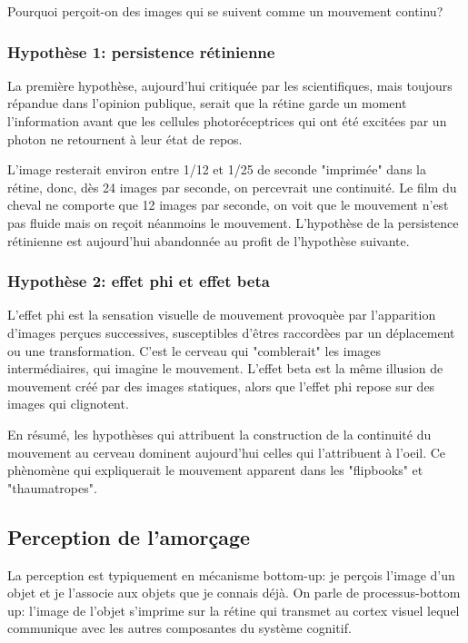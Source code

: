Pourquoi per\c{c}oit-on des images qui se suivent comme un mouvement continu?

\subsubsection{Hypoth\`ese 1: persistence r\'etinienne}

La premi\`ere hypoth\`ese, aujourd'hui critiqu\'ee par les scientifiques, mais toujours r\'epandue dans l'opinion publique, serait que la r\'etine garde un moment l'information avant que les cellules photor\'eceptrices qui ont \'et\'e excit\'ees par un photon ne retournent \`a leur \'etat de repos.

L'image resterait environ entre 1/12 et 1/25 de seconde "imprim\'ee" dans la r\'etine, donc, d\`es 24 images par seconde, on percevrait une continuit\'e. Le film du cheval ne comporte que 12 images par seconde, on voit que le mouvement n'est pas fluide mais on re\c{c}oit n\'eanmoins le mouvement. L'hypoth\`ese de la persistence r\'etinienne est aujourd'hui abandonn\'ee au profit de l'hypoth\`ese suivante.

\subsubsection{Hypoth\`ese 2: effet phi et effet beta}

L'effet phi est la sensation visuelle de mouvement provoqu\`ee par l'apparition d'images per\c{c}ues successives, susceptibles d'\^etres raccord\`ees par un d\'eplacement ou une transformation. C'est le cerveau qui "comblerait" les images interm\'ediaires, qui imagine le mouvement. L'effet beta est la m\^eme illusion de mouvement cr\'e\'e par des images statiques, alors que l'effet phi repose sur des images qui clignotent.

En r\'esum\'e, les hypoth\`eses qui attribuent la construction de la continuit\'e du mouvement au cerveau dominent aujourd'hui celles qui l'attribuent \`a l'oeil. Ce ph\`enom\`ene qui expliquerait le mouvement apparent dans les "flipbooks" et "thaumatropes".

\subsection{Perception de l'amor\c{c}age}

La perception est typiquement en m\'ecanisme bottom-up: je per\c{c}ois l'image d'un objet et je l'associe aux objets que je connais d\'ej\`a. On parle de processus-bottom up: l'image de l'objet s'imprime sur la r\'etine qui transmet au cortex visuel lequel communique avec les autres composantes du syst\`eme cognitif.

